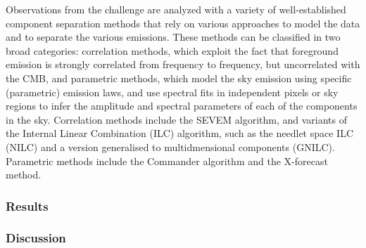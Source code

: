 \documentclass[PICOReport.tex]{subfiles}
\begin{document}

Observations from the challenge are analyzed with a variety of well-established component separation methods that rely on various approaches to model the data and to separate the various emissions. These methods can be classified in two broad categories: correlation methods, which exploit the fact that foreground emission is strongly correlated from frequency to frequency, but uncorrelated with the CMB, and parametric methods, which model the sky emission using specific (parametric) emission laws, and use spectral fits in independent pixels or sky regions to infer the amplitude and spectral parameters of each of the components in the sky. Correlation methods include the SEVEM algorithm, and variants of the Internal Linear Combination (ILC) algorithm, such as the needlet space ILC (NILC) and a version generalised to multidmensional components (GNILC). Parametric methods include the Commander algorithm and the X-forecast method.

\subsubsection{Results}

\subsubsection{Discussion}
\end{document}
